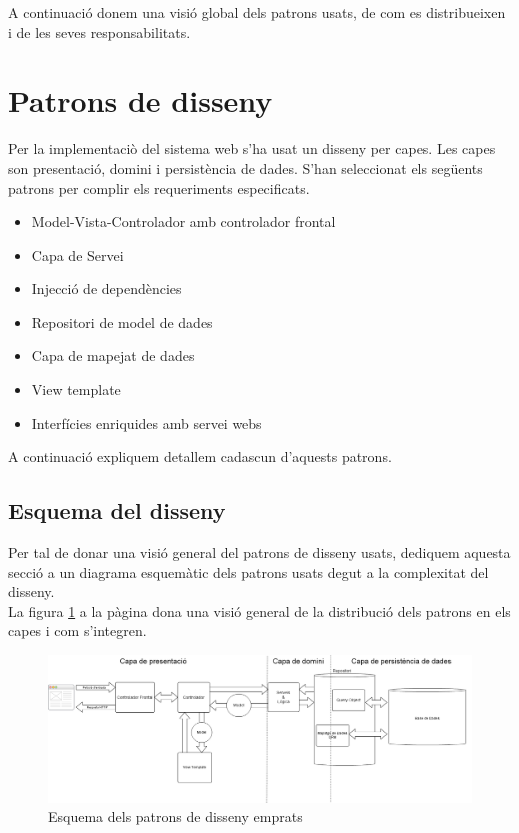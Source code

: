 A continuació donem una visió global dels patrons usats, de com es distribueixen i de les seves responsabilitats.

\section{Patrons de disseny}
Per la implementaci\`{o} del sistema web s'ha usat un disseny per capes. Les capes son presentaci\'{o}, domini i persistència de dades. S'han seleccionat els següents patrons per complir els requeriments especificats.
  \begin{itemize}
  \item Model-Vista-Controlador amb controlador frontal
  \item Capa de Servei
  \item Injecci\'{o} de depend\`{e}ncies
  \item Repositori de model de dades
  \item Capa de mapejat de dades
  \item View template
  \item Interfícies enriquides amb servei webs
  \end{itemize}
A continuació expliquem detallem cadascun d'aquests patrons.

\subsection{Esquema del disseny}
\label{subsec:dessigndiagram}
Per tal de donar una visió general del patrons de disseny usats, dediquem aquesta secció a un diagrama esquemàtic dels patrons usats degut a la complexitat del disseny.\\

La figura \ref{fig:dessignpatters} a la p\`{a}gina \pageref{fig:dessignpatters} dona una visió general de la distribució dels patrons en els capes i com s'integren.\\
\begin{figure}
  \includegraphics[scale=0.4]{img/design/IchnaeaPatterns.png}
  \caption{Esquema dels patrons de disseny emprats}
  \label{fig:dessignpatters}
\end{figure}

